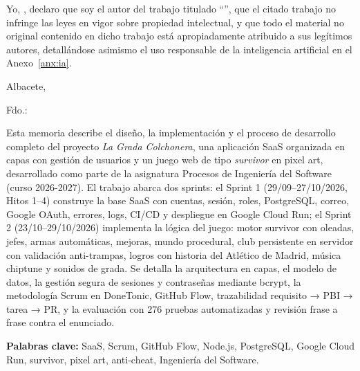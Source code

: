 Yo, \autor, declaro que soy el autor del trabajo titulado ``\titulo'', que el citado trabajo no infringe las leyes en vigor sobre propiedad intelectual, y que todo el material no original contenido en dicho trabajo está apropiadamente atribuido a sus legítimos autores, detallándose asimismo el uso responsable de la inteligencia artificial en el Anexo~\ref{anx:ia}.

\vspace*{2cm}
\begin{center}
Albacete, \fecha

\vskip3cm

Fdo.: \autor
\end{center}


\cleardoublepage
\thispagestyle{plain}
\begin{center}
\Large{}
\end{center}
\vskip1cm

Esta memoria describe el diseño, la implementación y el proceso de desarrollo completo del proyecto \textit{La Grada Colchonera}, una aplicación SaaS organizada en capas con gestión de usuarios y un juego web de tipo \textit{survivor} en pixel art, desarrollado como parte de la asignatura Procesos de Ingeniería del Software (curso 2026-2027). El trabajo abarca dos sprints: el Sprint 1 (29/09–27/10/2026, Hitos 1–4) construye la base SaaS con cuentas, sesión, roles, PostgreSQL, correo, Google OAuth, errores, logs, CI/CD y despliegue en Google Cloud Run; el Sprint 2 (23/10–29/10/2026) implementa la lógica del juego: motor survivor con oleadas, jefes, armas automáticas, mejoras, mundo procedural, club persistente en servidor con validación anti-trampas, logros con historia del Atlético de Madrid, música chiptune y sonidos de grada. Se detalla la arquitectura en capas, el modelo de datos, la gestión segura de sesiones y contraseñas mediante bcrypt, la metodología Scrum en DoneTonic, GitHub Flow, trazabilidad requisito → PBI → tarea → PR, y la evaluación con 276 pruebas automatizadas y revisión frase a frase contra el enunciado.

\medskip
\noindent\textbf{Palabras clave:} SaaS, Scrum, GitHub Flow, Node.js, PostgreSQL, Google Cloud Run, survivor, pixel art, anti-cheat, Ingeniería del Software.

\cleardoublepage
\thispagestyle{plain}
\begin{center}
\Large{}
\end{center}
\vskip1cm

